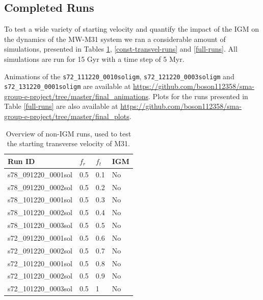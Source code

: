 \documentclass[a4paper,12pt, english]{article}
\begin{document}
\subsection{Completed Runs}
\label{completed-runs}
To test a wide variety of starting velocity and quantify the impact of the IGM on the dynamics of the MW-M31 system we ran a considerable amount of simulations, presented in Tables \ref{const-radvel-runs}, \ref{const-transvel-runs} and \ref{full-runs}. All simulations are run for 15 Gyr with a time step of 5 Myr.\par
\smallskip
Animations of the \texttt{s72\_111220\_0010soligm}, \texttt{s72\_121220\_0003soligm} and \texttt{s72\_131220\_0001soligm} are available at \url{https://github.com/boson112358/sma-group-e-project/tree/master/final_animations}. Plots for the runs presented in Table \ref{full-runs} are also available at \url{https://github.com/boson112358/sma-group-e-project/tree/master/final_plots}.\par
\begin{table}[!h]
\centering
\begin{tabular}{@{}l|l|l|l@{}}
\toprule
Run ID               & \(f_{r}\) & \(f_{t}\) & IGM \\ \midrule
s78\_091220\_0001sol & 0.5       & 0.1       & No  \\
s78\_091220\_0002sol & 0.5       & 0.2       & No  \\
s78\_101220\_0001sol & 0.5       & 0.3       & No  \\
s78\_101220\_0002sol & 0.5       & 0.4       & No  \\
s78\_101220\_0003sol & 0.5       & 0.5       & No  \\
s72\_091220\_0001sol & 0.5       & 0.6       & No  \\
s72\_091220\_0002sol & 0.5       & 0.7       & No  \\
s72\_101220\_0001sol & 0.5       & 0.8       & No  \\
s72\_101220\_0002sol & 0.5       & 0.9       & No  \\
s72\_101220\_0003sol & 0.5       & 1         & No  \\ \bottomrule
\end{tabular}
\caption{Overview of non-IGM runs, used to test the starting transverse velocity of M31.}
\label{const-radvel-runs}
\end{table}\par
\end{document}
